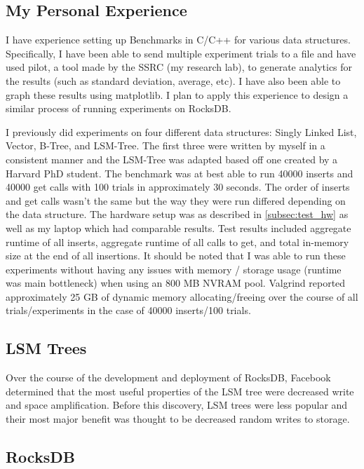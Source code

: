 \documentclass[twocolumn,11pt]{article}
\begin{document}
\subsection{My Personal Experience}
\label{subsec:personal_experience}

I have experience setting up Benchmarks in C/C++ for various data structures.
Specifically, I have been able to send multiple experiment trials to a file and
have used pilot, a tool made by the SSRC (my research lab), to generate
analytics for the results (such as standard deviation, average, etc). I have
also been able to graph these results using matplotlib. I plan to apply this
experience to design a similar process of running experiments on RocksDB.

I previously did experiments on four different data structures: Singly Linked
List, Vector, B-Tree, and LSM-Tree. The first three were written by myself in a
consistent manner and the LSM-Tree was adapted based off one created by a
Harvard PhD student. The benchmark was at best able to run 40000 inserts and
40000 get calls with 100 trials in approximately 30 seconds. The order of
inserts and get calls wasn't the same but the way they were run differed
depending on the data structure. The hardware setup was as described in
\ref{subsec:test_hw} as well as my laptop which had comparable results. Test
results included aggregate runtime of all inserts, aggregate runtime of all
calls to get, and total in-memory size at the end of all insertions. It should
be noted that I was able to run these experiments without having any issues with
memory / storage usage (runtime was main bottleneck) when using an 800 MB NVRAM
pool. Valgrind reported approximately 25 GB of dynamic memory allocating/freeing
over the course of all trials/experiments in the case of 40000 inserts/100
trials.

\subsection{LSM Trees}


Over the course of the development and deployment of RocksDB, Facebook
determined that the most useful properties of the LSM tree were decreased write
and space amplification. Before this discovery, LSM trees were less popular and
their most major benefit was thought to be decreased random writes to storage.

\subsection{RocksDB}
\end{document}
